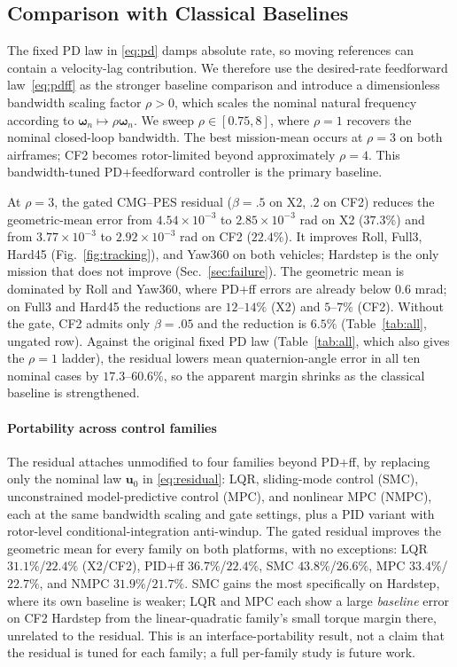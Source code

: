 \documentclass[letterpaper, 10 pt, conference]{ieeeconf}
\begin{document}
\subsection{Comparison with Classical Baselines}
\label{sec:baselines}

The fixed PD law in \eqref{eq:pd} damps absolute rate, so moving references can contain a velocity-lag contribution. We therefore use the desired-rate feedforward law~\eqref{eq:pdff} as the stronger baseline comparison and introduce a dimensionless bandwidth scaling factor $\rho>0$, which scales the nominal natural frequency according to $\bm\omega_n\mapsto\rho\bm\omega_n$. We sweep $\rho\in[0.75,8]$, where $\rho=1$ recovers the nominal closed-loop bandwidth. The best mission-mean occurs at $\rho=3$ on both airframes; CF2 becomes rotor-limited beyond approximately $\rho=4$. This bandwidth-tuned PD+feedforward controller is the primary baseline.

At $\rho=3$, the gated CMG--PES residual ($\beta=.5$ on X2, $.2$ on CF2) reduces the geometric-mean error from $4.54\times10^{-3}$ to $2.85\times10^{-3}$ rad on X2 ($37.3\%$) and from $3.77\times10^{-3}$ to $2.92\times10^{-3}$ rad on CF2 ($22.4\%$). It improves Roll, Full3, Hard45 (Fig.~\ref{fig:tracking}), and Yaw360 on both vehicles; Hardstep is the only mission that does not improve (Sec.~\ref{sec:failure}). The geometric mean is dominated by Roll and Yaw360, where PD+ff errors are already below $0.6$ mrad; on Full3 and Hard45 the reductions are $12$--$14\%$ (X2) and $5$--$7\%$ (CF2). Without the gate, CF2 admits only $\beta=.05$ and the reduction is $6.5\%$ (Table~\ref{tab:all}, ungated row). Against the original fixed PD law (Table~\ref{tab:all}, which also gives the $\rho=1$ ladder), the residual lowers mean quaternion-angle error in all ten nominal cases by $17.3$--$60.6\%$, so the apparent margin shrinks as the classical baseline is strengthened.

\paragraph{Portability across control families} The residual attaches unmodified to four families beyond PD+ff, by replacing only the nominal law $\bm u_0$ in \eqref{eq:residual}: LQR, sliding-mode control (SMC), unconstrained model-predictive control (MPC), and nonlinear MPC (NMPC), each at the same bandwidth scaling and gate settings, plus a PID variant with rotor-level conditional-integration anti-windup. The gated residual improves the geometric mean for every family on both platforms, with no exceptions: LQR $31.1\%$/$22.4\%$ (X2/CF2), PID+ff $36.7\%$/$22.4\%$, SMC $43.8\%$/$26.6\%$, MPC $33.4\%$/$22.7\%$, and NMPC $31.9\%$/$21.7\%$. SMC gains the most specifically on Hardstep, where its own baseline is weaker; LQR and MPC each show a large \emph{baseline} error on CF2 Hardstep from the linear-quadratic family's small torque margin there, unrelated to the residual. This is an interface-portability result, not a claim that the residual is tuned for each family; a full per-family study is future work.
\end{document}
